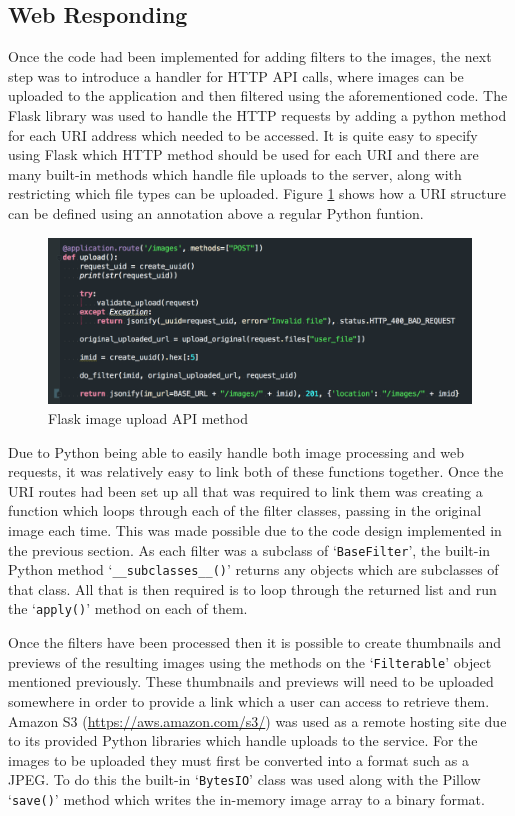 \documentclass[a4paper,12pt]{report}
\begin{document}
    \subsection{Web Responding}
      Once the code had been implemented for adding filters to the images, the next step was to introduce a handler for HTTP API calls, where images can be uploaded to the application and then filtered using the aforementioned code. The Flask library was used to handle the HTTP requests by adding a python method for each URI address which needed to be accessed. It is quite easy to specify using Flask which HTTP method should be used for each URI and there are many built-in methods which handle file uploads to the server, along with restricting which file types can be uploaded. Figure \ref{fig:upload-api-method} shows how a URI structure can be defined using an annotation above a regular Python funtion.

      \begin{figure}[h]
        \centering
        \includegraphics[width=0.7\linewidth]{upload-api-method}
        \caption{Flask image upload API method}
        \label{fig:upload-api-method}
      \end{figure}

      Due to Python being able to easily handle both image processing and web requests, it was relatively easy to link both of these functions together.  Once the URI routes had been set up all that was required to link them was creating a function which loops through each of the filter classes, passing in the original image each time. This was made possible due to the code design implemented in the previous section. As each filter was a subclass of ‘\texttt{BaseFilter}’, the built-in Python method ‘\texttt{\_\_subclasses\_\_()}’ returns any objects which are subclasses of that class. All that is then required is to loop through the returned list and run the ‘\texttt{apply()}’ method on each of them.

      Once the filters have been processed then it is possible to create thumbnails and previews of the resulting images using the methods on the ‘\texttt{Filterable}’ object mentioned previously. These thumbnails and previews will need to be uploaded somewhere in order to provide a link which a user can access to retrieve them. Amazon S3 (\url{https://aws.amazon.com/s3/}) was used as a remote hosting site due to its provided Python libraries which handle uploads to the service. For the images to be uploaded they must first be converted into a format such as a JPEG. To do this the built-in ‘\texttt{BytesIO}’ class was used along with the Pillow ‘\texttt{save()}’ method which writes the in-memory image array to a binary format.
\end{document}
